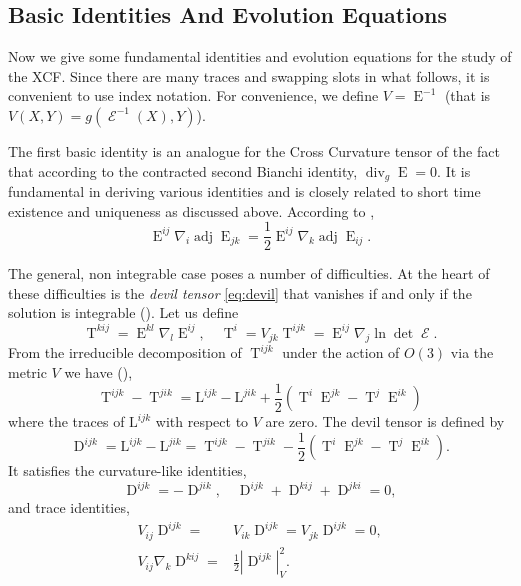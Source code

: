\documentclass{cambridge7a}
\renewcommand{\~}{\tilde}
\renewcommand{\-}{\bar}
\newcommand{\8}{\infty}
\DeclareMathOperator{\dive}{div}
\DeclareMathOperator{\Ein}{E}
\DeclareMathOperator{\opEin}{\mathcal{E}}
\DeclareMathOperator{\adj}{adj}
\DeclareMathOperator{\T}{T}
\DeclareMathOperator{\Dv}{D}
\begin{document}
\subsection{Basic Identities And Evolution Equations}
\label{subsec:xcf_identities}

Now we give some fundamental identities and evolution equations for the study of the XCF. Since there are many traces and swapping slots in what follows, it is convenient to use index notation. For convenience, we define \(V = \Ein^{-1}\) (that is \(V(X, Y) = g(\opEin^{-1} (X), Y)\)).

The first basic identity is an analogue for the Cross Curvature tensor of the fact that according to the contracted second Bianchi identity, \(\dive_g \Ein = 0\). It is fundamental in deriving various identities and is closely related to short time existence and uniqueness as discussed above. According to \cite[Lemma 1 (b)]{MR2055396},
\begin{equation}
\label{eq:xcf_integ}
\Ein^{ij} \nabla_i \adj\Ein_{jk} = \frac{1}{2} \Ein^{ij} \nabla_k \adj\Ein_{ij}.
\end{equation}

The general, non integrable case poses a number of difficulties. At the heart of these difficulties is the \emph{devil tensor} \eqref{eq:devil} that vanishes if and only if the solution is integrable (). Let us define
\begin{equation}
\label{eq:T}
\T^{kij} = \Ein^{kl}\nabla_l \Ein^{ij}, \quad \T^i = V_{jk}\T^{ijk} = \Ein^{ij}\nabla_j \ln\det\opEin.
\end{equation}
From the irreducible decomposition of $\T^{ijk}$ under the action of \(O(3)\) via the metric \(V\) we have (\cite[p. 6]{MR2055396}),
\[
\T^{ijk}-\T^{jik} = \mathrm{L}^{ijk}-\mathrm{L}^{jik} + \frac{1}{2}\left(\T^i\Ein^{jk}-\T^j\Ein^{ik}\right)
\]
where the traces of $\mathrm{L}^{ijk}$ with respect to $V$ are zero. The devil tensor is defined by
\begin{equation}
\label{eq:devil}
\Dv^{ijk}=\mathrm{L}^{ijk}-\mathrm{L}^{jik} = \T^{ijk}-\T^{jik} - \frac{1}{2}\left(\T^i\Ein^{jk}-\T^j\Ein^{ik}\right).
\end{equation}
It satisfies the curvature-like identities,
\[
\Dv^{ijk} = -\Dv^{jik},\quad \Dv^{ijk}+\Dv^{kij}+\Dv^{jki} = 0,
\]
and trace identities,
\begin{align*}
V_{ij}\Dv^{ijk}=&V_{ik}\Dv^{ijk}=V_{jk}\Dv^{ijk}=0,\\
V_{ij}\nabla_k\Dv^{kij}=&\frac{1}{2}|\Dv^{ijk}|_V^2.
\end{align*}
\end{document}
